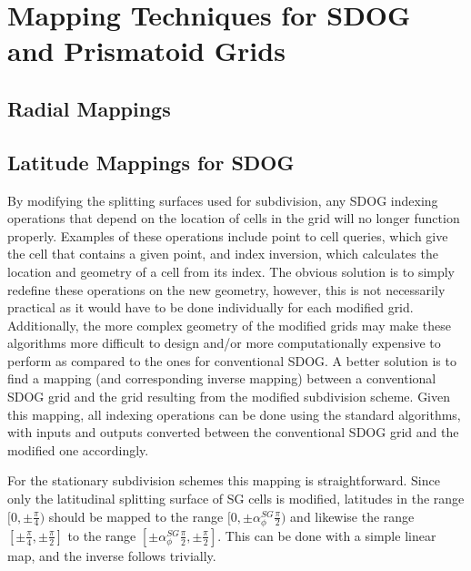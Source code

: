\chapter{Mapping Techniques for SDOG and Prismatoid Grids} \label{chap:mapping}

\section{Radial Mappings}
\section{Latitude Mappings for SDOG}

By modifying the splitting surfaces used for subdivision, any SDOG indexing operations that depend on the location of cells in the grid will no longer function properly.
Examples of these operations include point to cell queries, which give the cell that contains a given point, and index inversion, which calculates the location and geometry of a cell from its index.
The obvious solution is to simply redefine these operations on the new geometry, however, this is not necessarily practical as it would have to be done individually for each modified grid.
Additionally, the more complex geometry of the modified grids may make these algorithms more difficult to design and/or more computationally expensive to perform as compared to the ones for conventional SDOG.
A better solution is to find a mapping (and corresponding inverse mapping) between a conventional SDOG grid and the grid resulting from the modified subdivision scheme.
Given this mapping, all indexing operations can be done using the standard algorithms, with inputs and outputs converted between the conventional SDOG grid and the modified one accordingly.


For the stationary subdivision schemes this mapping is straightforward.
Since only the latitudinal splitting surface of SG cells is modified, latitudes in the range $[0, \pm\frac{\pi}{4})$ should be mapped to the range $[0, \pm\alpha_{\phi}^{SG} \frac{\pi}{2})$ and likewise the range $[\pm\frac{\pi}{4}, \pm\frac{\pi}{2}]$ to the range $[\pm\alpha_{\phi}^{SG} \frac{\pi}{2}, \pm\frac{\pi}{2}]$.
This can be done with a simple linear map, and the inverse follows trivially.


